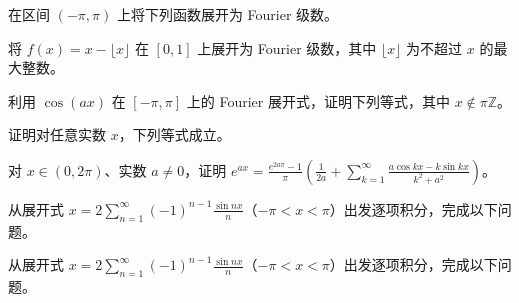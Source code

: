 \noindent\begin{minipage}{\textwidth}
在区间 $(-\pi,\pi)$ 上将下列函数展开为 Fourier 级数。
\end{minipage}\par\vfill
\noindent\begin{minipage}{\textwidth}
将 $f(x)=x-\lfloor x\rfloor$ 在 $[0,1]$ 上展开为 Fourier 级数，其中 $\lfloor x\rfloor$ 为不超过 $x$ 的最大整数。
\end{minipage}\par\vfill
\newpage
\noindent\begin{minipage}{\textwidth}
利用 $\cos(ax)$ 在 $[-\pi,\pi]$ 上的 Fourier 展开式，证明下列等式，其中 $x\notin\pi\mathbb Z$。
\end{minipage}\par\vfill
\noindent\begin{minipage}{\textwidth}
证明对任意实数 $x$，下列等式成立。
\end{minipage}\par\vfill
\noindent\begin{minipage}{\textwidth}
对 $x\in(0,2\pi)$、实数 $a\ne0$，证明 $\displaystyle e^{ax}=\frac{e^{2a\pi}-1}{\pi}\left(\frac1{2a}+\sum_{k=1}^{\infty}\frac{a\cos kx-k\sin kx}{k^2+a^2}\right)$。
\end{minipage}\par\vfill
\noindent\begin{minipage}{\textwidth}
从展开式 $\displaystyle x=2\sum_{n=1}^{\infty}(-1)^{n-1}\frac{\sin nx}{n}$（$-\pi<x<\pi$）出发逐项积分，完成以下问题。
\end{minipage}\par\vfill
\newpage
\noindent\begin{minipage}{\textwidth}
从展开式 $\displaystyle x=2\sum_{n=1}^{\infty}(-1)^{n-1}\frac{\sin nx}{n}$（$-\pi<x<\pi$）出发逐项积分，完成以下问题。
\end{minipage}\par\vfill
